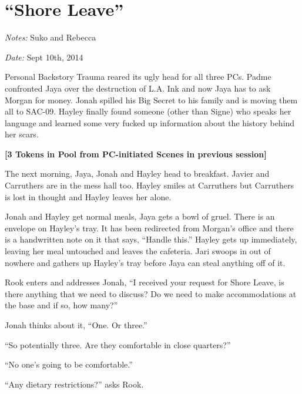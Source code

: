 \setcounter{chapter}{ 31 }
\chapter{\textbf{``Shore Leave''} }





\textit{Notes:} Suko and Rebecca

\textit{Date:} Sept 10th, 2014



Personal Backstory Trauma reared its ugly head for all three PCs.  Padme confronted Jaya over the destruction of L.A. Ink and now Jaya has to ask Morgan for money.  Jonah spilled his Big Secret to his family and is moving them all to SAC-09.  Hayley finally found someone (other than Signe) who speaks her language and learned some very fucked up information about the history behind her scars. 







\textbf{{[}3 Tokens in Pool from PC-initiated Scenes in previous session{]}}

The next morning, Jaya, Jonah and Hayley head to breakfast.  Javier and Carruthers are in the mess hall too.  Hayley smiles at Carruthers but Carruthers is lost in thought and Hayley leaves her alone.



Jonah and Hayley get normal meals, Jaya gets a bowl of gruel.  There is an envelope on Hayley's tray.  It has been redirected from Morgan's office and there is a handwritten note on it that says, ``Handle this.''  Hayley gets up immediately, leaving her meal untouched and leaves the cafeteria.  Jari swoops in out of nowhere and gathers up Hayley's tray before Jaya can steal anything off of it.



Rook enters and addresses Jonah, ``I received your request for Shore Leave, is there anything that we need to discuss?  Do we need to make accommodations at the base and if so, how many?''

Jonah thinks about it, ``One.  Or three.''

``So potentially three.  Are they comfortable in close quarters?''

``No one's going to be comfortable.''

``Any dietary restrictions?'' asks Rook.

